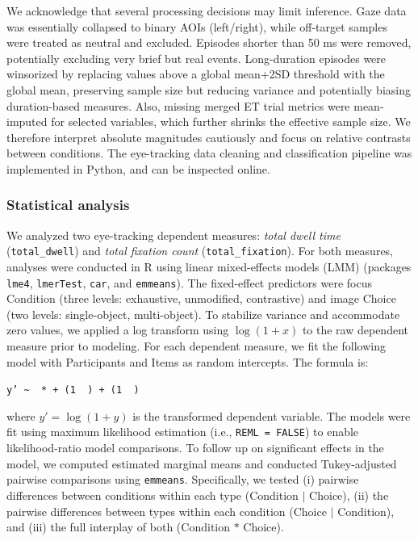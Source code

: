 \documentclass[ruler]{CUP-JNL-LIN}%
\begin{document}
We acknowledge that several processing decisions may limit inference. Gaze data was essentially collapsed to binary AOIs (left/right), while off-target samples were treated as neutral and excluded. Episodes shorter than 50 ms were removed, potentially excluding very brief but real events. Long-duration episodes were winsorized by replacing values above a global mean+2SD threshold with the global mean, preserving sample size but reducing variance and potentially biasing duration-based measures. Also, missing merged ET trial metrics were mean-imputed for selected variables, which further shrinks the effective sample size. We therefore interpret absolute magnitudes cautiously and focus on relative contrasts between conditions. The eye-tracking data cleaning and classification pipeline was implemented in Python, and can be inspected online.



\subsubsection{Statistical analysis}


We analyzed two eye-tracking dependent measures: \textit{total dwell time} (\texttt{total\_dwell}) and \textit{total fixation count} (\texttt{total\_fixation}). For both measures, analyses were conducted in R using linear mixed-effects models (LMM) (packages \texttt{lme4}, \texttt{lmerTest}, \texttt{car}, and \texttt{emmeans}). The fixed-effect predictors were focus Condition (three levels: exhaustive, unmodified, contrastive) and image Choice (two levels: single-object, multi-object). To stabilize variance and accommodate zero values, we applied a log transform using $\log(1+x)$ to the raw dependent measure prior to modeling. For each dependent measure, we fit the following model with Participants and Items as random intercepts. The formula is: 

\begin{center}
\texttt{y' \sim~ *  + (1 \mid~) + (1 \mid~)}
\end{center}

where $y' = \log(1+y)$ is the transformed dependent variable. The models were fit using maximum likelihood estimation (i.e., \texttt{REML = FALSE}) to enable likelihood-ratio model comparisons. To follow up on significant effects in the model, we computed estimated marginal means and conducted Tukey-adjusted pairwise comparisons using \texttt{emmeans}. Specifically, we tested (i) pairwise differences between conditions within each type (Condition $\mid$ Choice), (ii) the pairwise differences between types within each condition (Choice $\mid$ Condition), and (iii) the full interplay of both (Condition $\ast$ Choice).
\end{document}
